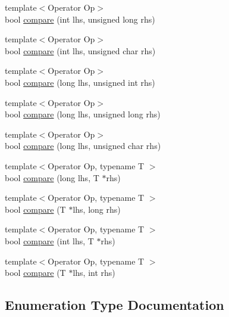 \begin{DoxyCompactItemize}
\item 
{\footnotesize template$<$Operator Op$>$ }\\bool \hyperlink{namespace_catch_1_1_internal_aac7a6452ed0d324031ceb7b4f3a3b61c}{compare} (int lhs, unsigned long rhs)
\item 
{\footnotesize template$<$Operator Op$>$ }\\bool \hyperlink{namespace_catch_1_1_internal_a7e82d987f62b9822107027c72a55fa6b}{compare} (int lhs, unsigned char rhs)
\item 
{\footnotesize template$<$Operator Op$>$ }\\bool \hyperlink{namespace_catch_1_1_internal_a0b4783ede1901e5c1baf8ff909bcce8d}{compare} (long lhs, unsigned int rhs)
\item 
{\footnotesize template$<$Operator Op$>$ }\\bool \hyperlink{namespace_catch_1_1_internal_ae9aec44a08d9cbb0d3dd46d438b50d2c}{compare} (long lhs, unsigned long rhs)
\item 
{\footnotesize template$<$Operator Op$>$ }\\bool \hyperlink{namespace_catch_1_1_internal_a79664b5f5f497fba57bd156e098de1f2}{compare} (long lhs, unsigned char rhs)
\item 
{\footnotesize template$<$Operator Op, typename T $>$ }\\bool \hyperlink{namespace_catch_1_1_internal_a829570ad9e724c687aa42190a696032b}{compare} (long lhs, T $\ast$rhs)
\item 
{\footnotesize template$<$Operator Op, typename T $>$ }\\bool \hyperlink{namespace_catch_1_1_internal_a3f89c65fdb06aa7b648c5acf0ca107a9}{compare} (T $\ast$lhs, long rhs)
\item 
{\footnotesize template$<$Operator Op, typename T $>$ }\\bool \hyperlink{namespace_catch_1_1_internal_a4f30c29e4adb62c7e209e5b988e59397}{compare} (int lhs, T $\ast$rhs)
\item 
{\footnotesize template$<$Operator Op, typename T $>$ }\\bool \hyperlink{namespace_catch_1_1_internal_a95361ddae55c9a390e6510bdadccb1fc}{compare} (T $\ast$lhs, int rhs)
\end{DoxyCompactItemize}


\subsection{Enumeration Type Documentation}
\mbox{\label{namespace_catch_1_1_internal_ae3f96598a7858155750bf38e7295d83e}} 
